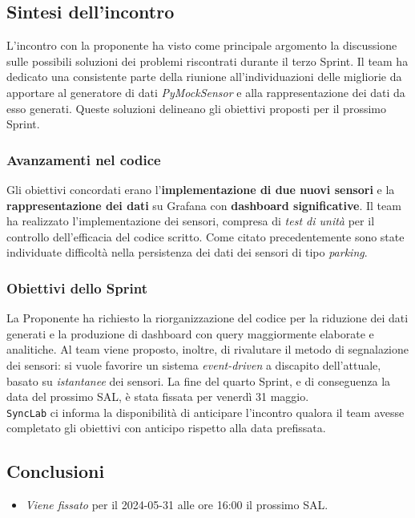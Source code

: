 \documentclass[8pt]{article}
\begin{document}
\subsection{Sintesi dell'incontro}
L'incontro con la proponente ha visto come principale argomento la discussione sulle possibili soluzioni dei problemi riscontrati durante il terzo Sprint. Il team ha dedicato una consistente parte della riunione all'individuazioni delle migliorie da apportare al generatore di dati \textit{PyMockSensor} e alla rappresentazione dei dati da esso generati. Queste soluzioni delineano gli obiettivi proposti per il prossimo Sprint.

\subsubsection{Avanzamenti nel codice}
Gli obiettivi concordati erano l'\textbf{implementazione di due nuovi sensori} e la \textbf{rappresentazione dei dati} su Grafana con \textbf{dashboard significative}. Il team ha realizzato l'implementazione dei sensori, compresa di \textit{test di unità} per il controllo dell'efficacia del codice scritto. Come citato precedentemente sono state individuate difficoltà nella persistenza dei dati dei sensori di tipo \textit{parking}.

\subsubsection{Obiettivi dello Sprint}
La Proponente ha richiesto la riorganizzazione del codice per la riduzione dei dati generati e la produzione di dashboard con query maggiormente elaborate e analitiche. Al team viene proposto, inoltre, di rivalutare il metodo di segnalazione dei sensori: si vuole favorire un sistema \textit{event-driven} a discapito dell'attuale, basato su \textit{istantanee} dei sensori. La fine del quarto Sprint, e di conseguenza la data del prossimo SAL, è stata fissata per venerdì 31 maggio.\\
\texttt{SyncLab} ci informa la disponibilità di anticipare l'incontro qualora il team avesse completato gli obiettivi con anticipo rispetto alla data prefissata.

\subsection{Conclusioni}
\begin{itemize}
	\setlength\itemsep{0em}
	\item \textit{Viene fissato} per il 2024-05-31 alle ore 16:00 il prossimo SAL.
\end{itemize}
\end{document}
